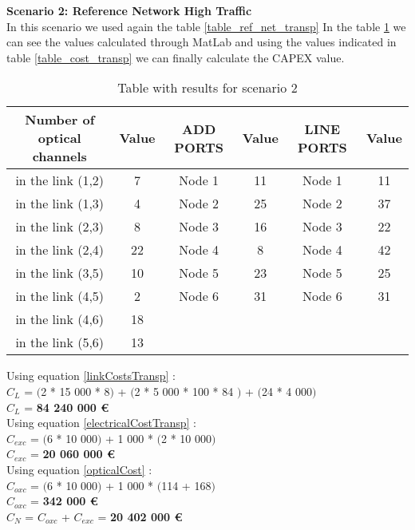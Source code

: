\textbf{Scenario 2: Reference Network High Traffic} \label{Scenario2_transp} \\

In this scenario we used again the table \ref{table_ref_net_transp} In the table \ref{result_ILP2_TP} we can see the values calculated through MatLab and using the values indicated in table \ref{table_cost_transp} we can finally calculate the CAPEX value.\\

\begin{table}[h!]
\centering
\begin{tabular}{|| c | c || c | c || c | c ||}
 \hline
 Number of optical channels & Value & ADD PORTS & Value & LINE PORTS & Value \\
 \hline\hline
 in the link (1,2) & 7 & Node 1 & 11 & Node 1 & 11 \\
 in the link (1,3) & 4 & Node 2 & 25 & Node 2 & 37 \\
 in the link (2,3) & 8 & Node 3 & 16 & Node 3 & 22 \\
 in the link (2,4) & 22 & Node 4 & 8 & Node 4 & 42 \\
 in the link (3,5) & 10 & Node 5 & 23 & Node 5 & 25 \\
 in the link (4,5) & 2 & Node 6 & 31 & Node 6 & 31 \\
 in the link (4,6) & 18 & & & & \\
 in the link (5,6) & 13 & & & & \\
 \hline
\end{tabular}
\caption{Table with results for scenario 2}
\label{result_ILP2_TP}
\end{table}


Using equation \ref{linkCostsTransp} : \\
$C_L$ = $($2 * 15 000 * 8$)$ + $($2 * 5 000 * 100 * 84 $)$ + $($24 * 4 000$)$ \\
$C_L$ = \textbf{84 240 000 \euro} \\

Using equation \ref{electricalCostTransp} : \\
$C_{exc}$ = $($6 * 10 000$)$ + 1 000 * $($2 * 10 000$)$ \\
$C_{exc}$ = \textbf{20 060 000 \euro} \\

Using equation \ref{opticalCost} : \\
$C_{oxc}$ = $($6 * 10 000$)$ + 1 000 * $($114 + 168$)$ \\
$C_{oxc}$ = \textbf{342 000 \euro} \\
$C_N$ = $C_{oxc}$ + $C_{exc}$ = \textbf{20 402 000 \euro} \\


